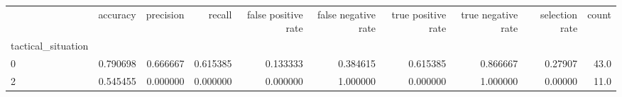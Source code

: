 \begin{tabular}{lrrrrrrrrr}
\toprule
{} &  accuracy &  precision &    recall &  false positive rate &  false negative rate &  true positive rate &  true negative rate &  selection rate &  count \\
tactical\_situation &           &            &           &                      &                      &                     &                     &                 &        \\
\midrule
0                  &  0.790698 &   0.666667 &  0.615385 &             0.133333 &             0.384615 &            0.615385 &            0.866667 &         0.27907 &   43.0 \\
2                  &  0.545455 &   0.000000 &  0.000000 &             0.000000 &             1.000000 &            0.000000 &            1.000000 &         0.00000 &   11.0 \\
\bottomrule
\end{tabular}
